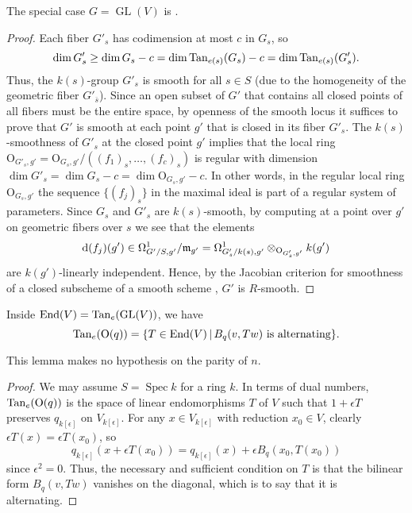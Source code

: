 \documentclass[10pt]{article}
\renewcommand{\O}{\mathscr{O}}
\newcommand{\GL}{\operatorname{GL}}
\renewcommand{\(}{\left(}
\renewcommand{\)}{\right)}
\newcommand{\Spec}{\operatorname{Spec}}
\renewcommand{\O}{\mathrm{O}}
\numberwithin{thm}{subsection}
\begin{document}
The special case $G = \GL(V)$ is \cite[II, \S5, 2.7]{dg}.

\begin{proof}
Each fiber $G'_s$ has codimension at most $c$ in $G_s$,
so 
$$\dim G'_s \ge \dim G_s - c = \dim {\rm{Tan}}_{e(s)}(G_s) - c = \dim {\rm{Tan}}_{e(s)}(G'_s).$$
Thus, the $k(s)$-group $G'_s$ is smooth for all $s \in S$ (due to the homogeneity of
the geometric fiber $G'_{\overline{s}}$).
Since an open subset of $G'$ that contains all closed points of all fibers must be the entire space,
by openness of the smooth locus it suffices to prove that $G'$ is smooth at each point
$g'$ that is closed in its fiber $G'_s$.  The $k(s)$-smoothness of $G'_s$ at the closed
point $g'$ implies that the local ring $\O_{G'_s,g'} = \O_{G_s,g'}/((f_1)_s,\dots,(f_c)_s)$
is regular with dimension $\dim G'_s = \dim G_s - c = \dim \O_{G_s,g'} - c$. 
In other words, in the regular local ring $\O_{G_s,g'}$ the sequence $\{(f_j)_s\}$ in the maximal ideal is 
part of a regular system of parameters.  Since $G_s$ and $G'_s$ are $k(s)$-smooth, by
computing at a point over $g'$ on geometric fibers over $s$ we see
that the elements 
$${\rm{d}}(f_j)(g') \in \Omega^1_{G'/S,g'}/\mathfrak{m}_{g'} = 
\Omega^1_{G'_s/k(s),g'} \otimes_{\O_{G'_s,g'}} k(g')$$
are $k(g')$-linearly independent.   Hence, by the Jacobian criterion
for smoothness of a closed subscheme of a smooth scheme \cite[2.2/7]{neron},
$G'$ is $R$-smooth.
\end{proof}

\begin{lem}\label{lieo} Inside ${\rm{End}}(V) = {\rm{Tan}}_e({\rm{GL}}(V))$, we have
$${\rm{Tan}}_e({\rm{O}}(q)) = 
\{T \in {\rm{End}}(V)\,|\,B_q(v,Tw) \mbox{\rm{ is alternating}}\}.$$
\end{lem}

This lemma makes no hypothesis on the parity of $n$.

\begin{proof}
We may assume $S = \Spec k$ for a ring $k$. 
In terms of dual numbers,
${\rm{Tan}}_e({\rm{O}}(q))$ 
is the space of linear endomorphisms $T$ of $V$ such that $1 + \epsilon T$
preserves $q_{k[\epsilon]}$ on $V_{k[\epsilon]}$.
For any $x \in V_{k[\epsilon]}$ 
with reduction $x_0 \in V$, clearly $\epsilon T(x) = \epsilon T(x_0)$, so 
$$q_{k[\epsilon]}(x + \epsilon T(x_0)) = 
q_{k[\epsilon]}(x) + \epsilon B_q(x_0, T(x_0))$$
since $\epsilon^2 = 0$.  Thus, the necessary and sufficient condition on
$T$ is that the bilinear form $B_q(v,Tw)$ vanishes on the diagonal, which is
to say that it is alternating.  
\end{proof}
\end{document}
